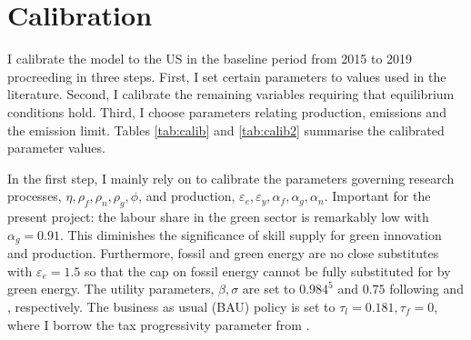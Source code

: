 \section{Calibration}\label{sec:calib}
I calibrate the model to the US in the baseline period from 2015 to 2019 procreeding in three steps. First, I set certain parameters to values used in the literature. Second, I calibrate the remaining variables requiring that equilibrium conditions hold. Third, I choose parameters relating production, emissions and the emission limit. Tables \ref{tab:calib} and \ref{tab:calib2} summarise the calibrated parameter values.

In the first step, I mainly rely on \cite{Fried2018ClimateAnalysis} to calibrate the parameters governing research processes, $\eta, \rho_f,\rho_n, \rho_g, \phi $, and production, $\varepsilon_e, \varepsilon_y, \alpha_f, \alpha_g, \alpha_n$.  Important for the present project: the labour share in the green sector is remarkably low with $\alpha_g=0.91$. This diminishes the significance of skill supply for green innovation and production. Furthermore, fossil and green energy are no close substitutes with $\varepsilon_e=1.5$ so that the cap on fossil energy cannot be fully substituted for by green energy. The utility parameters, $\beta, \sigma$ are set to $0.984^5$ and $0.75$ following \cite{Barrage2019OptimalPolicy} and \cite{Chetty2011AreMargins}, respectively. The business as usual (BAU) policy is set to $\tau_l=0.181, \tau_f=0$, where I borrow the tax progressivity parameter from \cite{Heathcote2017OptimalFramework}. 

